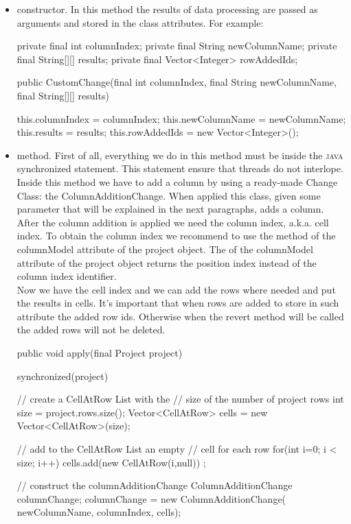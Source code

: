 \begin{itemize}
	\item constructor. In this method the results of data processing are passed as arguments and stored in the class attributes. For example:
	\begin{code}
   private final int columnIndex;
   private final String newColumnName;
   private final String[][] results;
   private final Vector<Integer> rowAddedIds;
	
public CustomChange(final int columnIndex,
                       final String newColumnName,
                       final String[][] results) {
   this.columnIndex = columnIndex;
   this.newColumnName = newColumnName;
   this.results = results;
   this.rowAddedIds = new Vector<Integer>();
   
}  
	\end{code}
	\item {} method. First of all, everything we do in this method must be inside the \textsc{java} synchronized statement. This statement ensure that threads do not interlope. Inside this method we have to add a column by using a ready-made Change Class: the ColumnAdditionChange. When applied this class, given some parameter that will be explained in the next paragraphs, adds a column. After the column addition is applied we need the column index, a.k.a. cell index. To obtain the column index we recommend to use the  method of the columnModel attribute of the project object. The  of the columnModel attribute of the project object returns the position index instead of the column index identifier. \\
	Now we have the cell index and we can add the rows where needed and put the results in cells. It's important that when rows are added to store in such attribute the added row ids. Otherwise when the revert method will be called the added rows will not be deleted.
	\begin{code}
public void apply(final Project project) {
   synchronized(project) {
     // create a CellAtRow List with the
     // size of the number of project rows      
     int size = project.rows.size();
     Vector<CellAtRow> cells = new Vector<CellAtRow>(size);
                
     // add to the CellAtRow List an empty 
     // cell for each row
     for(int i=0; i < size; i++)
        cells.add(new CellAtRow(i,null)) ;
     
     // construct the columnAdditionChange
     ColumnAdditionChange columnChange;
     columnChange = new ColumnAdditionChange(
             newColumnName, columnIndex, cells);
        
}}
\end{code}
\end{itemize}
